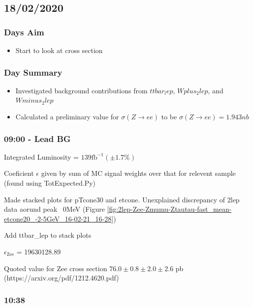 \subsection*{\textbf{18/02/2020}}
\subsubsection*{Days Aim}
\begin{itemize}
    \item Start to look at cross section
\end{itemize}

\subsubsection*{Day Summary}
\begin{itemize}
    \item Investigated background contributions from $ttbar_lep$, $Wplus_2lep$, and $Wminus_2lep$
    \item Calculated a preliminary value for $\sigma (Z \rightarrow ee)$ to be
    \subitem $\sigma (Z \rightarrow ee) = 1.943 nb$
\end{itemize}
\subsubsection*{09:00 - Lead BG}
Integrated Luminosity = $139 \text{fb}^{-1} (\pm 1.7\%)$

Coeficient $\epsilon$ given by sum of MC signal weights over that for relevent sample (found using TotExpected.Py) 

Made stacked plots for pTcone30 and etcone. Unexplained discrepancy of 2lep data aorund peak ~$0$MeV (Figure \ref{fig:2lep-Zee-Zmumu-Ztautau-fast_mean-etcone20_-2-5GeV_16-02-21_16-28}) 


Add ttbar\_lep to stack plots


$\epsilon_{\text{Zee}}$ = 19630128.89 

Quoted value for Zee cross section $76.0 \pm 0.8 \pm 2.0 \pm 2.6$ pb (https://arxiv.org/pdf/1212.4620.pdf)

\subsubsection*{10:38}

